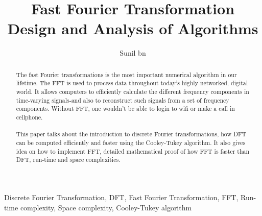\documentclass[preprint,12pt]{elsarticle}
\begin{document}
\begin{frontmatter}


\title{\textbf{Fast Fourier Transformation}\\
\small{Design and Analysis of Algorithms}}




\author{Sunil bn}

\address{University of Colorado, Boulder}

\begin{abstract}
The fast Fourier transformations is the most important numerical algorithm in our lifetime. The FFT is used to process data throughout today's highly networked, digital world. It allows computers to efficiently calculate the different frequency components in time-varying signals-and also to reconstruct such signals from a set of frequency components. Without FFT, one wouldn't be able to login to wifi or make a call in cellphone.\\\\
This paper talks about the introduction to discrete Fourier transformations, how DFT can be computed efficiently and faster using the Cooley-Tukey algorithm. It also gives idea on how to implement FFT, detailed mathematical proof of how FFT is faster than DFT, run-time and space complexities.
\end{abstract}

\begin{keyword}
Discrete Fourier Transformation, DFT, Fast Fourier Transformation, FFT, Run-time complexity, Space complexity, Cooley-Tukey algorithm



\end{keyword}

\end{frontmatter}
\end{document}
